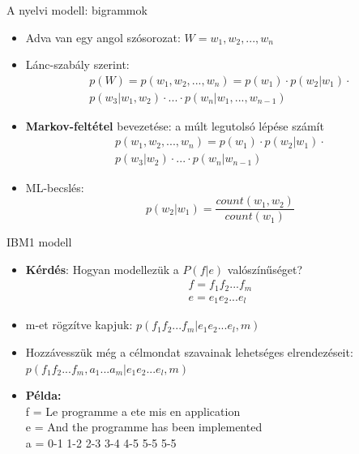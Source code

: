 \begin{frame}{A nyelvi modell: bigrammok}
	\begin{itemize}
		\item Adva van egy angol szósorozat: $W = w_1,w_2,...,w_n$
		\item Lánc-szabály szerint: \begin{equation*}
		\begin{split}
		p(W) = p(w_1,w_2,...,w_n) = p(w_1) \cdot p(w_2|w_1) \cdot \\p(w_3|w_1, w_2) \cdot ... \cdot p(w_n|w_1,...,w_{n-1})
		\end{split}
		\end{equation*}
		\item \textbf{Markov-feltétel} bevezetése: a múlt legutolsó lépése számít
		\begin{equation*}
		\begin{split}
		p(w_1,w_2,...,w_n) = p(w_1) \cdot p(w_2|w_1) \cdot \\p(w_3|w_2) \cdot ... \cdot p(w_n|w_{n-1})
		\end{split}
		\end{equation*}
		\item ML-becslés: 
		\begin{equation*}
		p(w_2|w_1) = \frac{count(w_1,w_2)}{count(w_1)}
		\end{equation*}
	\end{itemize}
\end{frame}

\begin{frame}{IBM1 modell}
	\begin{itemize}
		\item \textbf{Kérdés}: Hogyan modellezük a $P(f|e)$ valószínűséget?
			\begin{equation*}
			\begin{split}
			f = f_1f_2...f_m\\
			e = e_1e_2...e_l
			\end{split}
			\end{equation*}
		\item m-et rögzítve kapjuk: $p(f_1f_2...f_m|e_1e_2...e_l, m)$
		\item Hozzávesszük még a célmondat szavainak lehetséges elrendezéseit:
		$p(f_1f_2...f_m, a_1...a_m|e_1e_2...e_l, m)$
		\item \textbf{Példa:}\\
				f = Le programme a ete mis en application\\
				e = And the programme has been implemented \\
				a = 0-1 1-2 2-3 3-4 4-5 5-5 5-5
	\end{itemize}

\end{frame}

